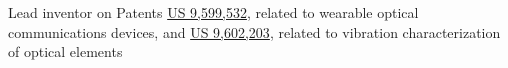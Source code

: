 \item Lead inventor on Patents \href{https://patents.google.com/patent/US9599532}{US 9,599,532}, related to wearable optical communications devices, 
and \href{https://patents.google.com/patent/US9602203B2/en}{US 9,602,203}, related to vibration characterization of optical elements